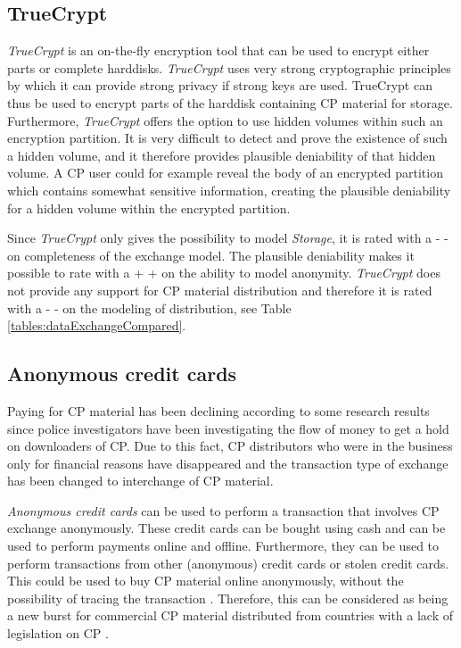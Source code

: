 \documentclass{sig-alternate-br}
\begin{document}
\subsection{TrueCrypt}
\textit{TrueCrypt} is an on-the-fly encryption tool that can be used to encrypt either parts or complete harddisks. \textit{TrueCrypt} uses very strong cryptographic principles \cite{miao2010research} by which it can provide strong privacy if strong keys are used. TrueCrypt can thus be used to encrypt parts of the harddisk containing CP material for storage. Furthermore, \textit{TrueCrypt} offers the option to use hidden volumes within such an encryption partition. It is very difficult to detect and prove the existence of such a hidden volume, and it therefore provides plausible deniability of that hidden volume. A CP user could for example reveal the body of an encrypted partition which contains somewhat sensitive information, creating the plausible deniability for a hidden volume within the encrypted partition.

Since \textit{TrueCrypt} only gives the possibility to model \textit{Storage}, it is rated with a - - on completeness of the exchange model. The plausible deniability makes it possible to rate with a + + on the ability to model anonymity. \textit{TrueCrypt} does not provide any support for CP material distribution and therefore it is rated with a - - on the modeling of distribution, see Table \ref{tables:dataExchangeCompared}.

\subsection{Anonymous credit cards}
Paying for CP material has been declining according to some research results \cite{wortley2006child,wijk2009achter,beech2008internet} since police investigators have been investigating the flow of money to get a hold on downloaders of CP. Due to this fact, CP distributors who were in the business only for financial reasons have disappeared and the transaction type of exchange has been changed to interchange of CP material.

\textit{Anonymous credit cards} can be used to perform a transaction that involves CP exchange anonymously. These credit cards can be bought using cash and can be used to perform payments online and offline. Furthermore, they can be used to perform transactions from other (anonymous) credit cards or stolen credit cards. This could be used to buy CP material online anonymously, without the possibility of tracing the transaction \cite{wall2007cybercrime}. Therefore, this can be considered as being a new burst for commercial CP material distributed from countries with a lack of legislation on CP \cite{kierkegaard2008cybering}.
\end{document}
